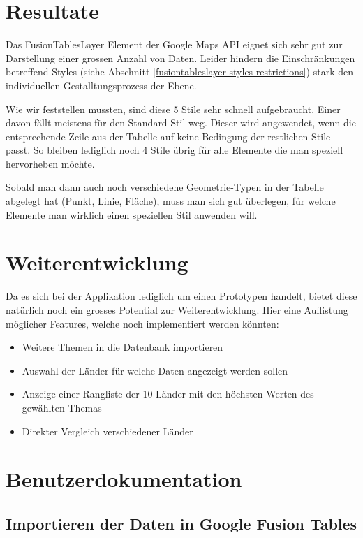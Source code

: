 \section{Resultate}
Das FusionTablesLayer Element der Google Maps API eignet sich sehr gut zur Darstellung einer grossen Anzahl von Daten. Leider hindern die Einschränkungen betreffend Styles (siehe Abschnitt  \ref{fusiontableslayer-styles-restrictions}) stark den individuellen Gestalltungsprozess der Ebene.

Wie wir feststellen mussten, sind diese 5 Stile sehr schnell aufgebraucht. Einer davon fällt meistens für den Standard-Stil weg. Dieser wird angewendet, wenn die entsprechende Zeile aus der Tabelle auf keine Bedingung der restlichen Stile passt. So bleiben lediglich noch 4 Stile übrig für alle Elemente die man speziell hervorheben möchte.

Sobald man dann auch noch verschiedene Geometrie-Typen in der Tabelle abgelegt hat (Punkt, Linie, Fläche), muss man sich gut überlegen, für welche Elemente man wirklich einen speziellen Stil anwenden will.

\section{Weiterentwicklung}
Da es sich bei der Applikation lediglich um einen Prototypen handelt, bietet diese natürlich noch ein grosses Potential zur Weiterentwicklung. Hier eine Auflistung möglicher Features, welche noch implementiert werden könnten:

\begin{itemize}
\item Weitere Themen in die Datenbank importieren
\item Auswahl der Länder für welche Daten angezeigt werden sollen
\item Anzeige einer Rangliste der 10 Länder mit den höchsten Werten des gewählten Themas
\item Direkter Vergleich verschiedener Länder
\end{itemize}


\section{Benutzerdokumentation}
\subsection{Importieren der Daten in Google Fusion Tables}

